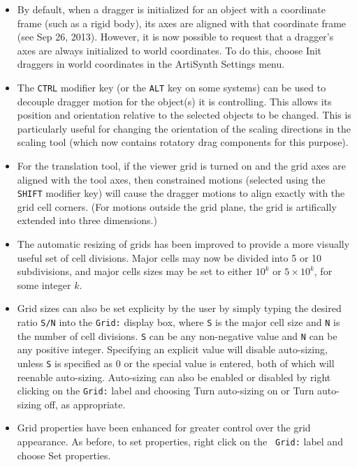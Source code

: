 \documentclass{article}
\begin{document}
\begin{itemize}

\item By default, when a dragger is initialized for an object with a
coordinate frame (such as a rigid body), its axes are aligned with
that coordinate frame (see Sep 26, 2013). However, it is now possible
to request that a dragger's axes are always initialized to world
coordinates. To do this, choose {\sf Init draggers in world
coordinates} in the ArtiSynth {\sf Settings} menu.

\item The {\tt CTRL} modifier key (or the {\tt ALT} key on some
systems) can be used to decouple dragger motion for the object(s) it
is controlling. This allows its position and orientation relative to
the selected objects to be changed. This is particularly useful for
changing the orientation of the scaling directions in the scaling
tool (which now contains rotatory drag components for this
purpose).

\item For the translation tool, if the viewer grid is turned on and
the grid axes are aligned with the tool axes, then constrained motions
(selected using the {\tt SHIFT} modifier key) will cause the dragger
motions to align exactly with the grid cell corners. (For motions
outside the grid plane, the grid is artifically extended into three
dimensions.)

\item The automatic resizing of grids has been improved to provide a
more visually useful set of cell divisions. Major cells may now be
divided into 5 or 10 subdivisions, and major cells sizes may be
set to either $10^k$ or $5 \times 10^k$, for some integer $k$.

\item Grid sizes can also be set explicity by the user by simply
typing the desired ratio {\tt S/N} into the {\tt Grid:} display box,
where {\tt S} is the major cell size and {\tt N} is the number of cell
divisions. {\tt S} can be any non-negative value and {\tt N} can be
any positive integer. Specifying an explicit value will disable
auto-sizing, unless {\tt S} is specified as 0 or the special value
{\tt *} is entered, both of which will reenable
auto-sizing. Auto-sizing can also be enabled or disabled by right
clicking on the {\tt Grid:} label and choosing {\sf Turn auto-sizing
on} or {\sf Turn auto-sizing off}, as appropriate.

\item Grid properties have been enhanced for greater control over the
grid appearance. As before, to set properties, right click on the {\tt
Grid:} label and choose {\sf Set properties}.

\end{itemize}
\end{document}
